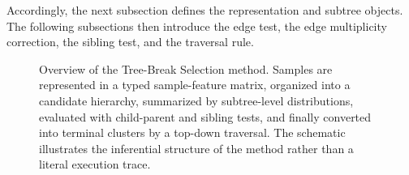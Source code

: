 Accordingly, the next subsection defines the representation and subtree
objects. The following subsections then introduce the edge test, the edge
multiplicity correction, the sibling test, and the traversal rule.

\begin{figure}[p]
\centering
\resizebox{0.77\textwidth}{!}{}
\caption{Overview of the Tree-Break Selection method. Samples are represented in a typed
sample-feature matrix, organized into a candidate hierarchy, summarized by
subtree-level distributions, evaluated with child-parent and sibling tests, and
finally converted into terminal clusters by a top-down traversal. The schematic
illustrates the inferential structure of the method rather than a literal
execution trace.}
\end{figure}
